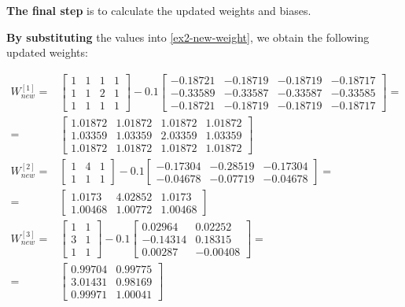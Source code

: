 \documentclass[12pt]{article}
\begin{document}
\begin{enumerate}[leftmargin=\labelsep]
        \textbf{The final step} is to calculate the updated weights and biases.

        \textbf{By substituting} the values into \eqref{ex2-new-weight}, we obtain the following updated weights:

        \vskip -0.2cm
        \begin{align*}
          W^{[1]}_{new} = & \begin{bmatrix} 1 & 1 & 1 & 1 \\ 1 & 1 & 2 & 1 \\ 1 & 1 & 1 & 1\end{bmatrix}
          - 0.1 \begin{bmatrix} -0.18721 & -0.18719 & -0.18719 & -0.18717 \\ -0.33589 & -0.33587 & -0.33587 & -0.33585 \\ -0.18721 & -0.18719 & -0.18719 & -0.18717 \end{bmatrix} = \\
          =               & \begin{bmatrix} 1.01872 & 1.01872 & 1.01872 & 1.01872 \\ 1.03359 & 1.03359 & 2.03359 & 1.03359 \\ 1.01872 & 1.01872 & 1.01872 & 1.01872 \end{bmatrix}   \\
          W^{[2]}_{new} = & \begin{bmatrix} 1 & 4 & 1 \\ 1 & 1 & 1 \end{bmatrix} -
          0.1 \begin{bmatrix} -0.17304 & -0.28519 & -0.17304\\ -0.04678 & -0.07719 & -0.04678 \end{bmatrix} =                                                                       \\
          =               & \begin{bmatrix} 1.0173 & 4.02852 & 1.0173 \\ 1.00468 & 1.00772 & 1.00468\end{bmatrix}                                                                   \\
          W^{[3]}_{new} = & \begin{bmatrix} 1 & 1 \\ 3 & 1 \\ 1 & 1 \end{bmatrix} -
          0.1 \begin{bmatrix}  0.02964 & 0.02252 \\ -0.14314 & 0.18315 \\ 0.00287 & -0.00408 \end{bmatrix} =                                                                        \\
          =               & \begin{bmatrix} 0.99704 & 0.99775 \\ 3.01431 & 0.98169 \\ 0.99971 & 1.00041\end{bmatrix}
        \end{align*}


\end{enumerate}
\end{document}
